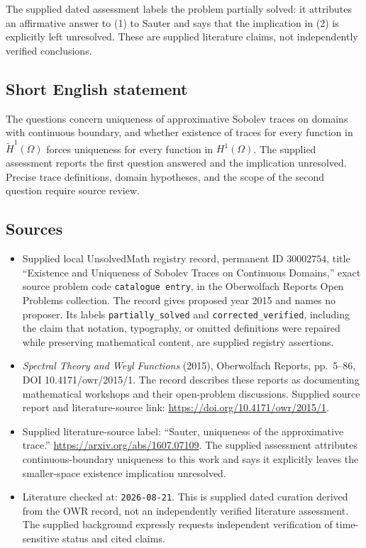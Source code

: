 \documentclass[11pt]{article}
\begin{document}
The supplied dated assessment labels the problem partially solved: it attributes an affirmative answer to (1) to Sauter and says that the implication in (2) is explicitly left unresolved. These are supplied literature claims, not independently verified conclusions.
\subsection{Short English statement}
The questions concern uniqueness of approximative Sobolev traces on domains with continuous boundary, and whether existence of traces for every function in \(\widetilde H^1(\Omega)\) forces uniqueness for every function in \(H^1(\Omega)\). The supplied assessment reports the first question answered and the implication unresolved. Precise trace definitions, domain hypotheses, and the scope of the second question require source review.
\subsection{Sources}
\begin{itemize}
\item Supplied local UnsolvedMath registry record, permanent ID \(30002754\), title ``Existence and Uniqueness of Sobolev Traces on Continuous Domains,'' exact source problem code \texttt{catalogue entry}, in the Oberwolfach Reports Open Problems collection. The record gives proposed year 2015 and names no proposer. Its labels \texttt{partially\_solved} and \texttt{corrected\_verified}, including the claim that notation, typography, or omitted definitions were repaired while preserving mathematical content, are supplied registry assertions.
\item \emph{Spectral Theory and Weyl Functions} (2015), Oberwolfach Reports, pp.\ 5--86, DOI 10.4171/owr/2015/1. The record describes these reports as documenting mathematical workshops and their open-problem discussions. Supplied source report and literature-source link: \url{https://doi.org/10.4171/owr/2015/1}.
\item Supplied literature-source label: ``Sauter, uniqueness of the approximative trace.'' \url{https://arxiv.org/abs/1607.07109}. The supplied assessment attributes continuous-boundary uniqueness to this work and says it explicitly leaves the smaller-space existence implication unresolved.
\item Literature checked at: \texttt{2026-08-21}. This is supplied dated curation derived from the OWR record, not an independently verified literature assessment. The supplied background expressly requests independent verification of time-sensitive status and cited claims.
\end{itemize}
\end{document}
